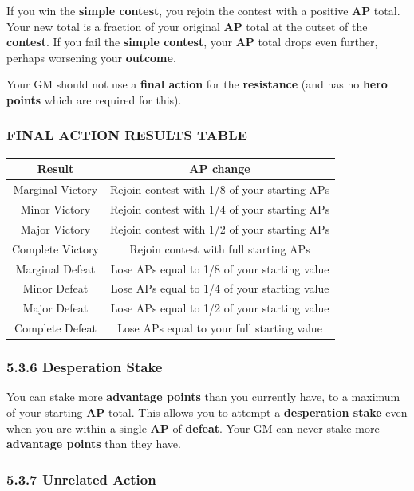 \documentclass[
]{article}
\begin{document}
If you win the \textbf{simple contest}, you rejoin the contest with a
positive \textbf{AP} total. Your new total is a fraction of your
original \textbf{AP} total at the outset of the \textbf{contest}. If you
fail the \textbf{simple contest}, your \textbf{AP} total drops even
further, perhaps worsening your \textbf{outcome}.

Your GM should not use a \textbf{final action} for the
\textbf{resistance} (and has no \textbf{hero points} which are required
for this).

\hypertarget{final-action-results-table}{%
\subsubsection{FINAL ACTION RESULTS
TABLE}\label{final-action-results-table}}

\begin{longtable}[]{@{}cc@{}}
\toprule
Result & AP change\tabularnewline
\midrule
\endhead
Marginal Victory & Rejoin contest with 1/8 of your starting
APs\tabularnewline
Minor Victory & Rejoin contest with 1/4 of your starting
APs\tabularnewline
Major Victory & Rejoin contest with 1/2 of your starting
APs\tabularnewline
Complete Victory & Rejoin contest with full starting APs\tabularnewline
Marginal Defeat & Lose APs equal to 1/8 of your starting
value\tabularnewline
Minor Defeat & Lose APs equal to 1/4 of your starting
value\tabularnewline
Major Defeat & Lose APs equal to 1/2 of your starting
value\tabularnewline
Complete Defeat & Lose APs equal to your full starting
value\tabularnewline
\bottomrule
\end{longtable}

\hypertarget{desperation-stake}{%
\subsubsection{5.3.6 Desperation Stake}\label{desperation-stake}}

You can stake more \textbf{advantage points} than you currently have, to
a maximum of your starting \textbf{AP} total. This allows you to attempt
a \textbf{desperation stake} even when you are within a single
\textbf{AP} of \textbf{defeat}. Your GM can never stake more
\textbf{advantage points} than they have.

\hypertarget{unrelated-action}{%
\subsubsection{5.3.7 Unrelated Action}\label{unrelated-action}}
\end{document}
